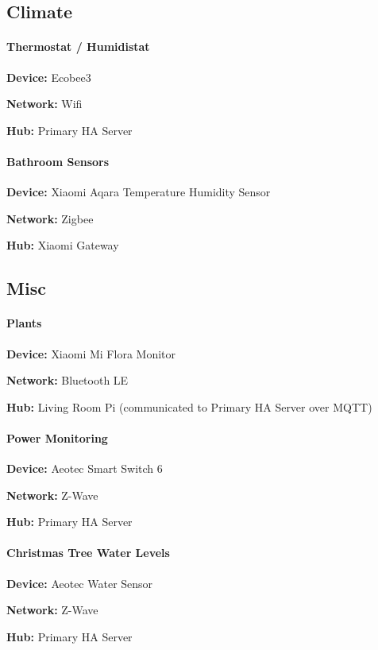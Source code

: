 \documentclass[]{article}
\let\oldparagraph\paragraph
\renewcommand{\paragraph}[1]{\oldparagraph{#1}\mbox{}}
\begin{document}
\begin{multicols}{2}
\subsection{\texorpdfstring{{Climate}}{Climate}}

\paragraph{\texorpdfstring{{Thermostat / Humidistat}}{Thermostat / Humidistat}}

\textbf{Device: }
{Ecobee3}

\textbf{Network: }
{Wifi}

\textbf{Hub: }
{Primary HA Server}

\paragraph{\texorpdfstring{{Bathroom Sensors}}{Bathroom Sensors}}

\textbf{Device: }
{Xiaomi Aqara Temperature Humidity Sensor}

\textbf{Network: }
{Zigbee}

\textbf{Hub: }
{Xiaomi Gateway}

\subsection{\texorpdfstring{{Misc}}{Misc}}

\paragraph{\texorpdfstring{{Plants}}{Plants}}

\textbf{Device: }
{Xiaomi Mi Flora Monitor}

\textbf{Network: }
{Bluetooth LE}

\textbf{Hub: }
{Living Room Pi (communicated to Primary HA Server over MQTT)}

\paragraph{\texorpdfstring{{Power Monitoring}}{Power Monitoring}}

\textbf{Device: }
{Aeotec Smart Switch 6}

\textbf{Network: }
{Z-Wave}

\textbf{Hub: }
{Primary HA Server}

\paragraph{\texorpdfstring{{Christmas Tree Water Levels}}{Christmas Tree Water Levels}}

\textbf{Device: }
{Aeotec Water Sensor}

\textbf{Network: }
{Z-Wave}

\textbf{Hub: }
{Primary HA Server}
\end{multicols}
\end{document}
